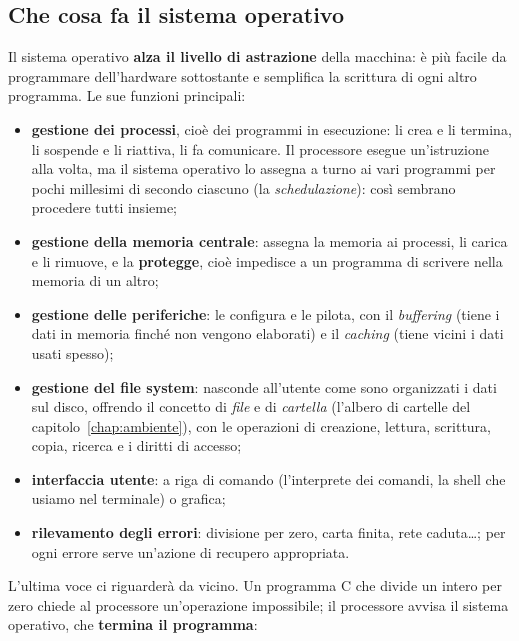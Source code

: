 \subsection{Che cosa fa il sistema operativo}

Il sistema operativo \textbf{alza il livello di astrazione} della macchina:
è più facile da programmare dell'hardware sottostante e semplifica la
scrittura di ogni altro programma. Le sue funzioni principali:

\begin{itemize}
  \item \textbf{gestione dei processi}, cioè dei programmi in esecuzione:
        li crea e li termina, li sospende e li riattiva, li fa comunicare.
        Il processore esegue un'istruzione alla volta, ma il sistema
        operativo lo assegna a turno ai vari programmi per pochi millesimi
        di secondo ciascuno (la \textit{schedulazione}): così sembrano
        procedere tutti insieme;
  \item \textbf{gestione della memoria centrale}: assegna la memoria ai
        processi, li carica e li rimuove, e la \textbf{protegge}, cioè
        impedisce a un programma di scrivere nella memoria di un altro;
  \item \textbf{gestione delle periferiche}: le configura e le pilota, con
        il \textit{buffering} (tiene i dati in memoria finché non vengono
        elaborati) e il \textit{caching} (tiene vicini i dati usati spesso);
  \item \textbf{gestione del file system}: nasconde all'utente come sono
        organizzati i dati sul disco, offrendo il concetto di \textit{file}
        e di \textit{cartella} (l'albero di cartelle del
        capitolo~\ref{chap:ambiente}), con le operazioni di creazione,
        lettura, scrittura, copia, ricerca e i diritti di accesso;
  \item \textbf{interfaccia utente}: a riga di comando (l'interprete dei
        comandi, la shell che usiamo nel terminale) o grafica;
  \item \textbf{rilevamento degli errori}: divisione per zero, carta
        finita, rete caduta\dots; per ogni errore serve un'azione di
        recupero appropriata.
\end{itemize}

L'ultima voce ci riguarderà da vicino. Un programma C che divide un intero
per zero chiede al processore un'operazione impossibile; il processore
avvisa il sistema operativo, che \textbf{termina il programma}:

